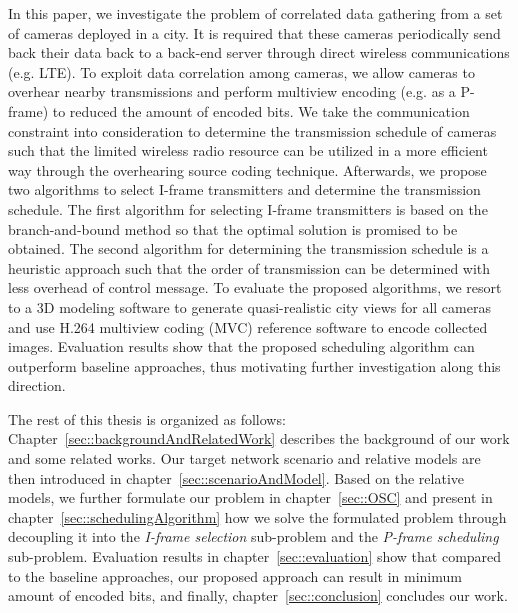 In this paper, we investigate the problem of correlated data gathering from a set of cameras deployed in a city.
It is required that these cameras periodically send back their data back to a back-end server through direct wireless communications (e.g. LTE).
To exploit data correlation among cameras, we allow cameras to overhear nearby transmissions and perform multiview encoding (e.g. as a P-frame) to reduced the amount of encoded bits.
We take the communication constraint into consideration to determine the transmission schedule of cameras such that the limited wireless radio resource can be utilized in a more efficient way through the overhearing source coding technique.
Afterwards, we propose two algorithms to select I-frame transmitters and determine the transmission schedule.
The first algorithm for selecting I-frame transmitters is based on the branch-and-bound method so that the optimal solution is promised to be obtained.
The second algorithm for determining the transmission schedule is a heuristic approach such that the order of transmission can be determined with less overhead of control message.
To evaluate the proposed algorithms, we resort to a 3D modeling software to generate quasi-realistic city views for all cameras and use H.264 multiview coding (MVC) reference software to encode collected images.
Evaluation results show that the proposed scheduling algorithm can outperform baseline approaches, thus motivating further investigation along this direction.

The rest of this thesis is organized as follows:
Chapter~\ref{sec::backgroundAndRelatedWork} describes the background of our work and some related works.
Our target network scenario and relative models are then introduced in chapter~\ref{sec::scenarioAndModel}.
Based on the relative models, we further formulate our problem in chapter~\ref{sec::OSC} and present in chapter~\ref{sec::schedulingAlgorithm} how we solve the formulated problem through decoupling it into the {\em I-frame selection} sub-problem and the {\em P-frame scheduling} sub-problem. 
Evaluation results in chapter~\ref{sec::evaluation} show that compared to the baseline approaches, our proposed approach can result in minimum amount of encoded bits, and finally, chapter~\ref{sec::conclusion} concludes our work.